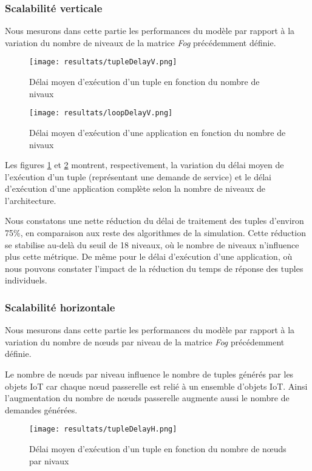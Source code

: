 \subsubsection{Scalabilité verticale}
Nous mesurons dans cette partie les performances du modèle par rapport à la variation du nombre de niveaux de la matrice \emph{Fog} précédemment définie.

\begin{figure}[H]
  \centering
  \texttt{[image: resultats/tupleDelayV.png]}
  \caption{Délai moyen d'exécution d'un tuple en fonction du nombre de nivaux}
  \label{fig:delai_tuple_vertical}
\end{figure}

\begin{figure}[H]
  \centering
  \texttt{[image: resultats/loopDelayV.png]}
  \caption{Délai moyen d'exécution d'une application en fonction du nombre de nivaux}
  \label{fig:delai_application_vertical}
\end{figure}

Les figures \ref{fig:delai_tuple_vertical} et \ref{fig:delai_application_vertical} montrent, respectivement, la variation du délai moyen de l'exécution d'un tuple (représentant une demande de service) et le délai d'exécution d'une application complète selon la nombre de niveaux de l'architecture.\par
Nous constatons une nette réduction du délai de traitement des tuples d'environ 75\%, en comparaison aux reste des algorithmes de la simulation. Cette réduction se stabilise au-delà du seuil de 18 niveaux, où le nombre de niveaux n'influence plus cette métrique. De même pour le délai d'exécution d'une application, où nous pouvons constater l'impact de la réduction du temps de réponse des tuples individuels.

\subsubsection{Scalabilité horizontale}
Nous mesurons dans cette partie les performances du modèle par rapport à la variation du nombre de nœuds par niveau de la matrice \emph{Fog} précédemment définie.\par
Le nombre de nœuds par niveau influence le nombre de tuples générés par les objets IoT car chaque nœud passerelle est relié à un ensemble d’objets IoT. Ainsi l’augmentation du nombre de nœuds passerelle augmente aussi le nombre de demandes générées.

\begin{figure}[H]
  \centering
  \texttt{[image: resultats/tupleDelayH.png]}
  \caption{Délai moyen d'exécution d'un tuple en fonction du nombre de nœuds par nivaux}
  \label{fig:delai_tuple_horizontal}
\end{figure}

